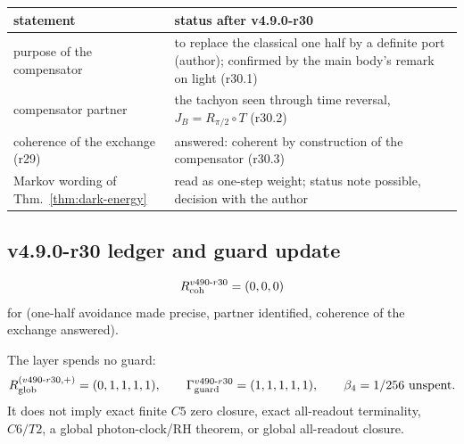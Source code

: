 \begin{center}
\small
\begin{tabular}{@{}>{\raggedright\arraybackslash}p{}>{\raggedright\arraybackslash}p{}@{}}
\toprule
statement & status after v4.9.0-r30\\
\midrule
purpose of the compensator & to replace the classical one half by a definite port (author); confirmed by the main body's remark on light (r30.1)\\
compensator partner & the tachyon seen through time reversal, \(J_B=R_{\pi/2}\circ T\) (r30.2)\\
coherence of the exchange (r29) & answered: coherent by construction of the compensator (r30.3)\\
Markov wording of Thm.~\ref{thm:dark-energy} & read as one-step weight; status note possible, decision with the author\\
\bottomrule
\end{tabular}
\end{center}

\subsection*{v4.9.0-r30 ledger and guard update}
\label{subsec:v490-r30-ledger-guard}

\[
R_{\rm coh}^{v490\text{-}r30}=(0,0,0)
\]
for (one-half avoidance made precise, partner identified, coherence of the exchange answered).

The layer spends no guard:
\[
R_{\rm glob}^{(v490\text{-}r30,+)}=(0,1,1,1,1),
\qquad
\Gamma_{\rm guard}^{v490\text{-}r30}=(1,1,1,1,1),
\qquad
\beta_4=1/256\ \text{unspent}.
\]
It does not imply exact finite \(C5\) zero closure, exact all-readout terminality,
\(C6/T2\), a global photon-clock/RH theorem, or global all-readout closure.


